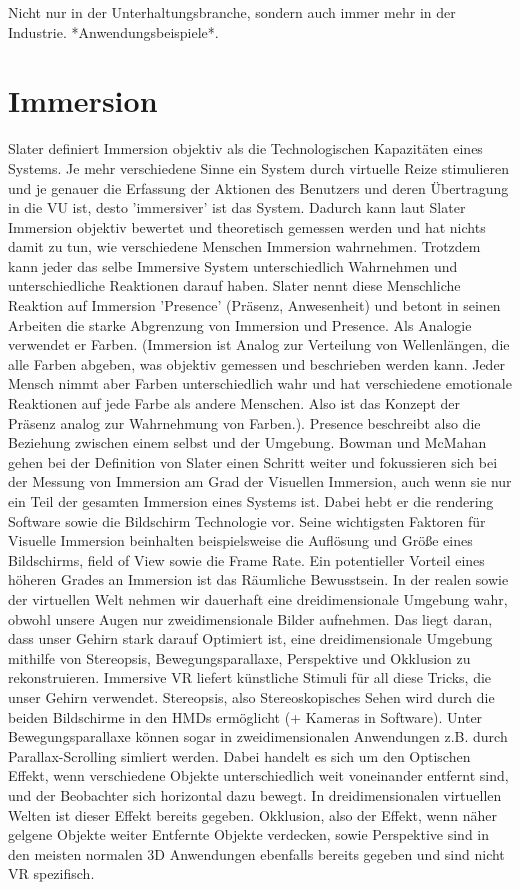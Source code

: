 Nicht nur in der Unterhaltungsbranche, sondern auch immer mehr in der Industrie.\cite{Ragan2010} *Anwendungsbeispiele*.
 

\section{Immersion}
Slater\cite{Slater2003}\cite{Slater1999} definiert Immersion objektiv als die Technologischen Kapazitäten eines Systems. Je mehr verschiedene Sinne ein System durch virtuelle Reize stimulieren und je genauer die Erfassung der Aktionen des Benutzers und deren Übertragung in die VU ist, desto 'immersiver' ist das System. Dadurch kann laut Slater Immersion objektiv bewertet und theoretisch gemessen werden und hat nichts damit zu tun, wie verschiedene Menschen Immersion wahrnehmen. Trotzdem kann jeder das selbe Immersive System unterschiedlich Wahrnehmen und unterschiedliche Reaktionen darauf haben. Slater nennt diese Menschliche Reaktion auf Immersion 'Presence' (Präsenz, Anwesenheit) und betont in seinen Arbeiten die starke Abgrenzung von Immersion und Presence. Als Analogie verwendet er Farben. (Immersion ist Analog zur Verteilung von Wellenlängen, die alle Farben abgeben, was objektiv gemessen und beschrieben werden kann. Jeder Mensch nimmt aber Farben unterschiedlich wahr und hat verschiedene emotionale Reaktionen auf jede Farbe als andere Menschen. Also ist das Konzept der Präsenz analog zur Wahrnehmung von Farben.). Presence beschreibt also die Beziehung zwischen einem selbst und der Umgebung.
Bowman und McMahan\cite{Bowman2007} gehen bei der Definition von Slater einen Schritt weiter und fokussieren sich bei der Messung von Immersion am Grad der Visuellen Immersion, auch wenn sie nur ein Teil der gesamten Immersion eines Systems ist. Dabei hebt er die rendering Software sowie die Bildschirm Technologie vor. Seine wichtigsten Faktoren für Visuelle Immersion beinhalten beispielsweise die Auflösung und Größe eines Bildschirms, field of View sowie die Frame Rate.
Ein potentieller Vorteil eines höheren Grades an Immersion ist das Räumliche Bewusstsein. In der realen sowie der virtuellen Welt nehmen wir dauerhaft eine dreidimensionale Umgebung wahr, obwohl unsere Augen nur zweidimensionale Bilder aufnehmen. Das liegt daran, dass unser Gehirn stark darauf Optimiert ist, eine dreidimensionale Umgebung mithilfe von Stereopsis, Bewegungsparallaxe, Perspektive und Okklusion zu rekonstruieren. 
Immersive VR liefert künstliche Stimuli für all diese Tricks, die unser Gehirn verwendet. Stereopsis, also Stereoskopisches Sehen wird durch die beiden Bildschirme in den HMDs ermöglicht (+ Kameras in Software). Unter Bewegungsparallaxe können sogar in zweidimensionalen Anwendungen z.B. durch Parallax-Scrolling simliert werden. Dabei handelt es sich um den Optischen Effekt, wenn verschiedene Objekte unterschiedlich weit voneinander entfernt sind, und der Beobachter sich horizontal dazu bewegt. In dreidimensionalen virtuellen Welten ist dieser Effekt bereits gegeben. Okklusion, also der Effekt, wenn näher gelgene Objekte weiter Entfernte Objekte verdecken, sowie Perspektive sind in den meisten normalen 3D Anwendungen ebenfalls bereits gegeben und sind nicht VR spezifisch.
